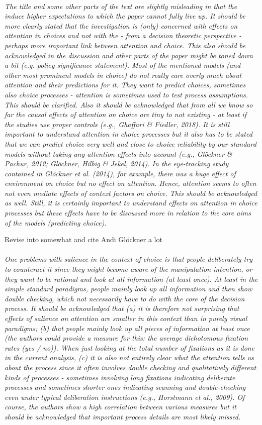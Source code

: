 \documentclass[english,natbib,man,floatsintext]{apa6}
\newcommand\eatpunct[1]{}
\newcommand{\com}[2][]{\vspace{5mm}\paragraph[ ]{ \eatpunct}\label{#1}\emph{#2}\vspace{5mm}}
\begin{document}
\com[com-r3-XX]{The title and some other parts of the text are slightly misleading in that the induce higher expectations to which the paper cannot fully live up. It should be more clearly stated that the investigation is (only) concerned with effects on attention in choices and not with the - from a decision theoretic perspective - perhaps more important link between attention and choice. This also should be acknowledged in the discussion and other parts of the paper might be toned down a bit (e.g. policy significance statement). Most of the mentioned models (and other most prominent models in choice) do not really care overly much about attention and their predictions for it. They want to predict choices, sometimes also choice processes - attention is sometimes used to test process assumptions. This should be clarified. Also it should be acknowledged that from all we know so far the causal effects of attention on choice are tiny to not existing - at least if the studies use proper controls (e.g., Ghaffari \& Fiedler, 2018). It is still important to understand attention in choice processes but it also has to be stated that we can predict choice very well and close to choice reliability by our standard models without taking any attention effects into account (e.g., Glöckner \& Pachur, 2012; Glöckner, Hilbig \& Jekel, 2014). In the eye-tracking study contained in Glöckner et al. (2014), for example, there was a huge effect of environment on choice but no effect on attention. Hence, attention seems to often not even mediate effects of context factors on choice. This should be acknowledged as well. Still, it is certainly important to understand effects on attention in choice processes but these effects have to be discussed more in relation to the core aims of the models (predicting choice).}

Revise into somewhat and cite Andi Glöckner a lot 

\com[com-r3-XX]{One problems with salience in the context of choice is that people deliberately try to counteract it since they might become aware of the manipulation intention, or they want to be rational and look at all information (at least once). At least in the simple standard paradigms, people mainly look up all information and then show double checking, which not necessarily have to do with the core of the decision process. It should be acknowledged that (a) it is therefore not surprising that effects of salience on attention are smaller in this context than in purely visual paradigms; (b) that people mainly look up all pieces of information at least once (the authors could provide a measure for this: the average dichotomous fixation rates (yes / no)). When just looking at the total number of fixations as it is done in the current analysis, (c) it is also not entirely clear what the attention tells us about the process since it often involves double checking and qualitatively different kinds of processes - sometimes involving long fixations indicating deliberate processes and sometimes shorter ones indicating scanning and double-checking even under typical deliberation instructions (e.g., Horstmann et al., 2009). Of course, the authors show a high correlation between various measures but it should be acknowledged that important process details are most likely missed.}
\end{document}
